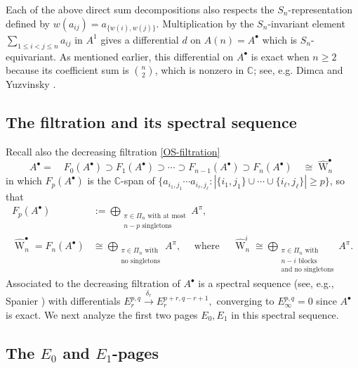 \documentclass[12pt]{amsart}
\theoremstyle{plain}
\theoremstyle{definition}
\begin{document}
Each of the above direct sum decompositions also respects the $S_n$-representation defined by $w(a_{ij})=a_{\{w(i),w(j)\}}$.  Multiplication by the $S_n$-invariant element
$\sum_{1\leq i<j \leq n} a_{ij}$ in $A^1$ gives a differential $d$ on $A(n)=A^\bullet$ which is 
$S_n$-equivariant.  As mentioned earlier, this differential on $A^\bullet$ is exact when $n \ge 2$
because its coefficient sum is
$\binom{n}{2}$, which is nonzero in ${{\mathbb C}}$; 
see, e.g. Dimca and Yuzvinsky \cite[\S 5]{DimcaYuzvinsky}.

\subsection{The filtration and its spectral sequence}

Recall also the decreasing filtration \eqref{OS-filtration}
$$
A^\bullet
 = \quad F_{0}(A^\bullet) 
  \supset F_{1}(A^\bullet) 
  \supset \cdots 
  \supset F_{n-1}(A^\bullet)   
  \supset F_{n}(A^\bullet) \quad \cong \widehat{{\operatorname{W}}}^\bullet_n
$$
in which $F_p(A^\bullet)$ is the ${{\mathbb C}}$-span of 
$\{ a_{i_1,j_1} \cdots a_{i_\ell,j_\ell}: 
|\{i_1,j_1\} \cup \cdots \cup \{i_\ell,j_\ell\}| \geq p \}$,
so that
$$
\begin{aligned}
F_p(A^\bullet)
 & :=\bigoplus_{\substack{\pi \in \Pi_n\text{ with at most}\\ n-p\text{ singletons} }} A^\pi,\\
\widehat{{\operatorname{W}}}_n^\bullet =F_n(A^\bullet) 
 &\cong \bigoplus_{\substack{\pi \in \Pi_n\text{ with}\\ \text{no singletons}}} A^\pi,
\quad \text{ where } \quad
\widehat{{\operatorname{W}}}_n^i \cong  
  \bigoplus_{\substack{\pi \in \Pi_n \text{ with}\\ n-i \text{ blocks}\\
                \text{and no singletons}} } A^\pi.
\end{aligned}
$$
Associated to the decreasing filtration of $A^\bullet$ is a spectral sequence
(see, e.g., Spanier \cite[\S 9.4, p. 493]{Spanier}) 
with differentials 
$
E_r^{p,q} \overset{\delta_r}{\longrightarrow} E_r^{p+r,q-r+1},
$ 
converging to $E^{p,q}_\infty=0$ since $A^\bullet$ is exact.  We next analyze
the first two pages $E_0, E_1$ in this spectral sequence.

\subsection{The $E_0$ and $E_1$-pages}
\end{document}
